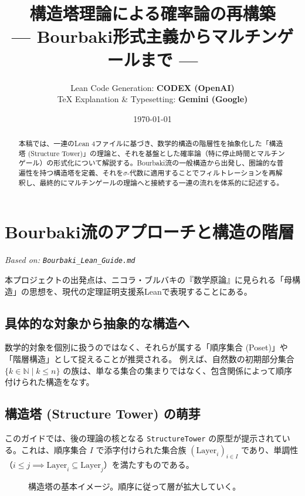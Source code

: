 \documentclass[a4paper,11pt]{ltjsarticle}
\title{\textbf{構造塔理論による確率論の再構築} \\ \large --- Bourbaki形式主義からマルチンゲールまで ---}
\author{
    Lean Code Generation: \textbf{CODEX (OpenAI)} \\
    TeX Explanation \& Typesetting: \textbf{Gemini (Google)}
}
\date{\today}
\theoremstyle{definition}
\newcommand{\N}{\mathbb{N}}
\newcommand{\Layer}[1]{\mathrm{Layer}_{#1}}
\begin{document}
\maketitle

\begin{abstract}
本稿では、一連のLean 4ファイルに基づき、数学的構造の階層性を抽象化した「構造塔 (Structure Tower)」の理論と、それを基盤とした確率論（特に停止時間とマルチンゲール）の形式化について解説する。Bourbaki流の一般構造から出発し、圏論的な普遍性を持つ構造塔を定義、それを$\sigma$-代数に適用することでフィルトレーションを再解釈し、最終的にマルチンゲールの理論へと接続する一連の流れを体系的に記述する。
\end{abstract}

\tableofcontents
\newpage

\section{Bourbaki流のアプローチと構造の階層}
\label{sec:bourbaki}
\textit{Based on: \texttt{Bourbaki\_Lean\_Guide.md}}

本プロジェクトの出発点は、ニコラ・ブルバキの『数学原論』に見られる「母構造」の思想を、現代の定理証明支援系Leanで表現することにある。

\subsection{具体的な対象から抽象的な構造へ}
数学的対象を個別に扱うのではなく、それらが属する「順序集合 (Poset)」や「階層構造」として捉えることが推奨される。
例えば、自然数の初期部分集合 $\{k \in \N \mid k \le n\}$ の族は、単なる集合の集まりではなく、包含関係によって順序付けられた構造をなす。

\subsection{構造塔 (Structure Tower) の萌芽}
このガイドでは、後の理論の核となる \texttt{StructureTower} の原型が提示されている。これは、順序集合 $I$ で添字付けられた集合族 $(\Layer{i})_{i \in I}$ であり、単調性（$i \le j \implies \Layer{i} \subseteq \Layer{j}$）を満たすものである。

\begin{figure}[h]
\centering
{}
\caption{構造塔の基本イメージ。順序に従って層が拡大していく。}
\end{figure}
\end{document}
